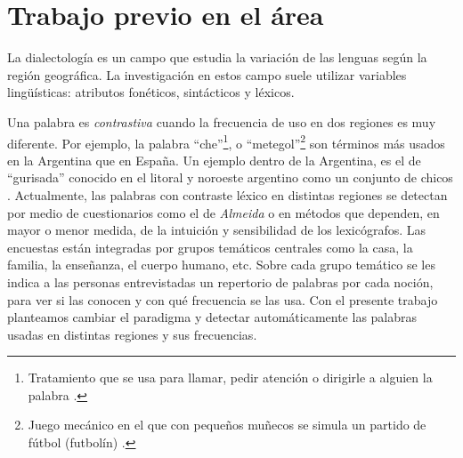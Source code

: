 




\section{Trabajo previo en el área}
La dialectología es un campo que estudia la variación de las lenguas según la región geográfica. La investigación en estos campo suele utilizar variables lingüísticas: atributos fonéticos, sintácticos y léxicos.

Una palabra es \textit{contrastiva} cuando la frecuencia de uso en dos regiones es muy diferente. Por ejemplo, la palabra ``che''\footnote{Tratamiento que se usa para llamar, pedir atención o dirigirle a alguien la palabra \cite{academia2008diccionario}.}, o ``metegol''\footnote{Juego mecánico en el que con pequeños muñecos se simula un partido de fútbol (futbolín) \cite{academia2008diccionario}.} son términos más usados en la Argentina que en España. Un ejemplo dentro de la Argentina, es el de ``gurisada'' conocido en el litoral y noroeste argentino como un conjunto de chicos \cite{academia2008diccionario}.
Actualmente, las palabras con contraste léxico en distintas regiones
se detectan por medio de cuestionarios como el de \emph{Almeida} \cite{almeida1995variacion} o en métodos que dependen, en mayor o menor medida, de la intuición y sensibilidad de los lexicógrafos. Las encuestas están integradas por grupos temáticos centrales como la casa, la familia, la enseñanza, el cuerpo humano, etc. Sobre cada grupo temático se les indica a las personas entrevistadas un repertorio de palabras por cada noción, para ver si las conocen y con qué frecuencia se las usa. 
Con el presente trabajo planteamos cambiar el paradigma y detectar automáticamente las palabras usadas en distintas regiones y sus frecuencias.

